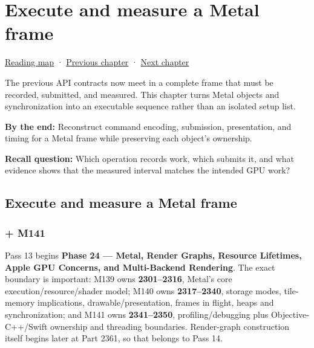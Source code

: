 \chapter{Execute and measure a Metal frame}\label{05-engine-i-ch023-execute-and-measure-a-metal-frame}\hypertarget{05-engine-i-ch023}{}\label{stagechapter:05-engine-i-ch023}

\hypertarget{05-engine-i-ch023-execute-and-measure-a-metal-frame}{}

\hyperref[volume-reading-map]{Reading map} · \hyperref[05-engine-i-ch022-vulkan-synchronization-and-multi-frame-lifetimes]{Previous chapter} · \hyperref[05-engine-i-ch024-profiling-and-languageplatform-ownership]{Next chapter}

The previous API contracts now meet in a complete frame that must be recorded, submitted, and measured. This chapter turns Metal objects and synchronization into an executable sequence rather than an isolated setup list.

\textbf{By the end:} Reconstruct command encoding, submission, presentation, and timing for a Metal frame while preserving each object's ownership.

\textbf{Recall question:} Which operation records work, which submits it, and what evidence shows that the measured interval matches the intended GPU work?

\section{Execute and measure a Metal frame}\label{05-engine-i-ch023-execute-and-measure-a-metal-frame-1}

\hypertarget{05-engine-i-ch023-execute-and-measure-a-metal-frame-1}{}

\subsection{+ M141}\label{05-engine-i-ch023-m141}

\hypertarget{05-engine-i-ch023-m141}{}

Pass 13 begins \textbf{Phase 24 --- Metal, Render Graphs, Resource Lifetimes, Apple GPU Concerns, and Multi-Backend Rendering}. The exact boundary is important: M139 owns \textbf{2301--2316}, Metal's core execution/resource/shader model; M140 owns \textbf{2317--2340}, storage modes, tile-memory implications, drawable/presentation, frames in flight, heaps and synchronization; and M141 owns \textbf{2341--2350}, profiling/debugging plus Objective-C++/Swift ownership and threading boundaries. Render-graph construction itself begins later at Part 2361, so that belongs to Pass 14.

